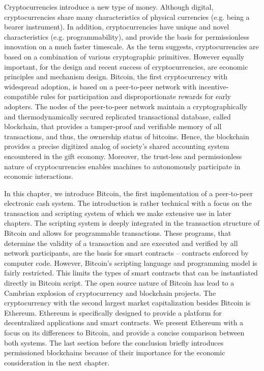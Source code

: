 Cryptocurrencies introduce a new type of money. Although digital, cryptocurrencies share many characteristics of physical currencies (e.g. being a bearer instrument). In addition, cryptocurrencies have unique and novel characteristics (e.g. programmability), and provide the basis for permissionless innovation on a much faster timescale. As the term suggests, cryptocurrencies are based on a combination of various cryptographic primitives. However equally important, for the design and recent success of cryptocurrencies, are economic principles and mechanism design. Bitcoin, the first cryptocurrency with widespread adoption, is based on a peer-to-peer network with incentive-compatible rules for participation and disproportionate rewards for early adopters. The nodes of the peer-to-peer network maintain a cryptographically and thermodynamically secured replicated transactional database, called blockchain, that provides a tamper-proof and verifiable memory of all transactions, and thus, the ownership status of bitcoins. Hence, the blockchain provides a precise digitized analog of society's shared accounting system encountered in the gift economy. Moreover, the trust-less and permissionless nature of cryptocurrencies enables machines to autonomously participate in economic interactions.

In this chapter, we introduce Bitcoin, the first implementation of a peer-to-peer electronic cash system. The introduction is rather technical with a focus on the transaction and scripting system of which we make extensive use in later chapters. The scripting system is deeply integrated in the transaction structure of Bitcoin and allows for programmable transactions. These programs, that determine the validity of a transaction and are executed and verified by all network participants, are the basis for smart contracts -- contracts enforced by computer code. However, Bitcoin's scripting language and programming model is fairly restricted. This limits the types of smart contracts that can be instantiated directly in Bitcoin script. 
The open source nature of Bitcoin has lead to a Cambrian explosion of cryptocurrency and blockchain projects. The cryptocurrency with the second largest market capitalization besides Bitcoin is Ethereum. Ethereum is specifically designed to provide a platform for decentralized applications and smart contracts. We present Ethereum with a focus on its differences to Bitcoin, and provide a concise comparison between both systems. The last section before the conclusion briefly introduces permissioned blockchains because of their importance for the economic consideration in the next chapter.


